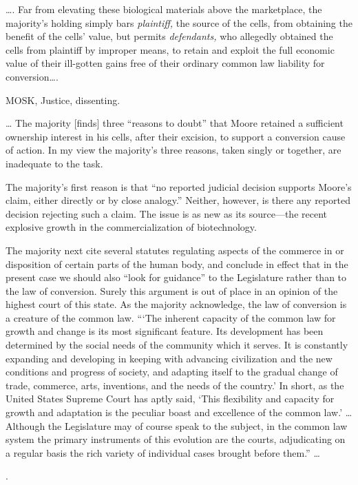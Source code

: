 {\dots}. Far from elevating these biological materials above the marketplace,
the majority's holding simply bars \textit{plaintiff,} the source of the cells,
from obtaining the benefit of the cells' value, but permits
\textit{defendants,} who allegedly obtained the cells from plaintiff by
improper means, to retain and exploit the full economic value of their
ill-gotten gains free of their ordinary common law liability for
conversion{\dots}.

MOSK, Justice, dissenting.

{\dots}  The majority [finds] three ``reasons to doubt'' that Moore retained a
sufficient ownership interest in his cells, after their excision, to support a
conversion cause of action. In my view the majority's three reasons, taken
singly or together, are inadequate to the task.

The majority's first reason is that ``no reported judicial decision supports
Moore's claim, either directly or by close analogy.'' Neither, however, is
there any reported decision rejecting such a claim. The issue is as new as its
source---the recent explosive growth in the commercialization of
biotechnology.

The majority next cite several statutes regulating aspects of the commerce in or
disposition of certain parts of the human body, and conclude in effect that in
the present case we should also ``look for guidance'' to the Legislature rather
than to the law of conversion. Surely this argument is out of place in an
opinion of the highest court of this state. As the majority acknowledge, the
law of conversion is a creature of the common law. ``{}`The inherent capacity
of the common law for growth and change is its most significant feature. Its
development has been determined by the social needs of the community which it
serves. It is constantly expanding and developing in keeping with advancing
civilization and the new conditions and progress of society, and adapting
itself to the gradual change of trade, commerce, arts, inventions, and the
needs of the country.' In short, as the United States Supreme Court has aptly
said, `This flexibility and capacity for growth and adaptation is the peculiar
boast and excellence of the common law.'  {\dots}  Although the Legislature may
of course speak to the subject, in the common law system the primary
instruments of this evolution are the courts, adjudicating on a regular basis
the rich variety of individual cases brought before them.'' {\dots}

{.
\par}

